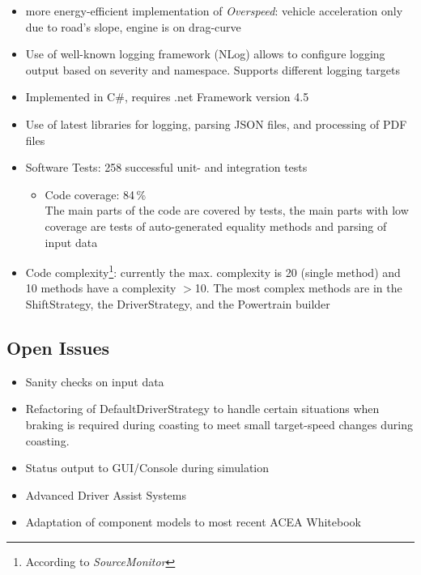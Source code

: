 \begin{itemize}
	\item more energy-efficient implementation of \textit{Overspeed}: vehicle acceleration only due to road's slope, engine is on drag-curve
	\item Use of well-known logging framework (NLog) allows to configure logging output based on severity and namespace. Supports different logging targets
	\item Implemented in C\#, requires .net Framework version 4.5
	\item Use of latest libraries for logging, parsing JSON files, and processing of PDF files
	\item Software Tests: 258 successful unit- and integration tests
	\begin{itemize}
		\item Code coverage: 84\,\% \\
		The main parts of the code are covered by tests, the main parts with low coverage are tests of auto-generated equality methods and parsing of input data
	\end{itemize}
	\item Code complexity\footnote{According to \textit{SourceMonitor}}: currently the max. complexity is 20 (single method) and 10 methods have a complexity $>$10. The most complex methods are in the ShiftStrategy, the DriverStrategy, and the Powertrain builder
\end{itemize}

\subsection{Open Issues} %
\label{sub:open_issues}

\begin{itemize}
	\item Sanity checks on input data
	\item Refactoring of DefaultDriverStrategy to handle certain situations when braking is required during coasting to meet small target-speed changes during coasting.
	\item Status output to GUI/Console during simulation
	\item Advanced Driver Assist Systems
	\item Adaptation of component models to most recent ACEA Whitebook
\end{itemize}

